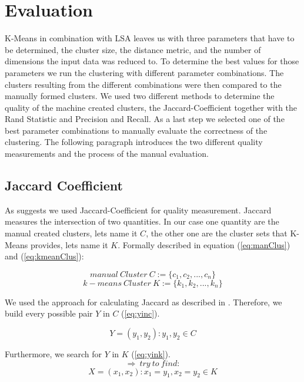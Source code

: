 \documentclass[a4paper]{IEEEtran}
\begin{document}
\section{Evaluation}
\label{sec:eval}
K-Means in combination with LSA leaves us with three parameters that have to be determined, the cluster size, the distance metric, and the number of dimensions the input data was reduced to. To determine the best values for those parameters we run the clustering with different parameter combinations. The clusters resulting from the different combinations were then compared to the manually formed clusters. We used two different methods to determine the quality of the machine created clusters, the Jaccard-Coefficient together with the Rand Statistic and Precision and Recall. As a last step we selected one of the best parameter combinations to manually evaluate the correctness of the clustering. The following paragraph introduces the two different quality measurements and the process of the manual evaluation.

\subsection{Jaccard Coefficient}
As \cite{halkidi2002cluster} suggests we used Jaccard-Coefficient for quality measurement. Jaccard measures the intersection of two quantities. In our case one quantity are the manual created clusters, lets name it $C$, the other one are the cluster sets that K-Means provides, lets name it $K$. Formally described in equation (\ref{eq:manClus}) and (\ref{eq:kmeanClus}):

\begin{equation}
\label{eq:manClus}
manual~Cluster~C := \{ c_1,c_2,...,c_n \}
\end{equation}
\begin{equation}
\label{eq:kmeanClus}
k-means~Cluster~K := \{ k_1,k_2,...,k_n \}
\end{equation}

We used the approach for calculating Jaccard as described in \cite{halkidi2002cluster}. Therefore, we build every possible pair $Y$ in $C$ (\ref{eq:yinc}).

\begin{equation}
\label{eq:yinc}
Y= ( y_1,y_2) : y_1, y_2 \in C
\end{equation}

Furthermore, we search for $Y$ in $K$ (\ref{eq:yink}). 
\begin{equation*}
\Rightarrow ~try~to~find:
\end{equation*}
\begin{equation}
\label{eq:yink}
X= ( x_1,x_2) : x_1= y_1,x_2= y_2 \in K
\end{equation}
\end{document}
